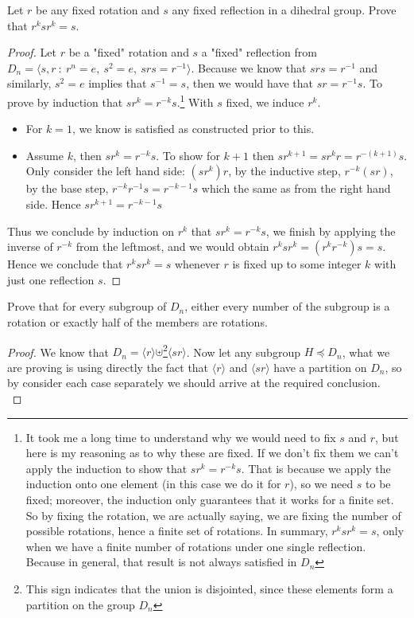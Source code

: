 \begin{assignment}[
  header=HeaderA,
  body=BodyA,
  title={Homework 2},
  duedate={17-February-2026},
  toc=false,
  toctitle={This appears on the Table of contents.},
  exlist=false
]
\begin{exer}[Problem 2.41]
Let $r$ be any fixed rotation and $s$ any fixed reflection in a dihedral group. Prove that $r^ksr^k = s$.
\begin{proof}
Let $r$ be a "fixed" rotation and $s$ a "fixed" reflection from $D_n = \langle s,r \ : \ r^n = e,\ s^2 = e,\ srs = r^{-1}\rangle$. Because we know that $srs = r^{-1}$ and similarly, $s^2 = e $ implies that $s^{-1} = s$, then we would have that $sr = r^{-1}s$. To prove by induction that $sr^k = r^{-k}s$.\footnote{It took me a long time to understand why we would need to fix $s$ and $r$, but here is my reasoning as to why these are fixed. If we don't fix them we can't apply the induction to show that $sr^{k} = r^{-k}s$. That is because we apply the induction onto one element (in this case we do it for $r$), so we need $s$ to be fixed; moreover, the induction only guarantees that it works for a finite set. So by fixing the rotation, we are actually saying, we are fixing the number of possible rotations, hence a finite set of rotations. In summary, $r^ksr^k = s$, only when we have a finite number of rotations under one single reflection. Because in general, that result is not always satisfied in $D_n$} With $s$ fixed, we induce $r^k$.

\begin{itemize}
    \item[Base case:] For $k = 1$, we know is satisfied as constructed prior to this. 
    \item[Induction:] Assume $k$, then $sr^k = r^{-k}s$. To show for $k+1$ then $sr^{k+1} = sr^kr = r^{-(k+1)}s$. Only consider the left hand side: $(sr^k)r$, by the inductive step, $r^{-k}(sr)$, by the base step, $r^{-k}r^{-1}s = r^{-k-1}s$ which the same as from the right hand side. Hence $sr^{k+1} = r^{-k-1}s$  
\end{itemize}

Thus we conclude by induction on $r^k$ that $sr^{k} = r^{-k}s$, we finish by applying the inverse of $r^{-k}$ from the leftmost, and we would obtain $r^{k}sr^{k} = (r^{k}r^{-k})s = s$. Hence we conclude that $r^ksr^k = s$ whenever $r$ is fixed up to some integer $k$ with just one reflection $s$.  
\end{proof}
\end{exer}

\begin{exer}[Problem 3.30]
Prove that for every subgroup of $D_n$, either every number of the subgroup is a rotation or exactly half of the members are rotations.    
\begin{proof}
We know that $D_n = \langle r\rangle $$\uplus$\footnote{This sign indicates that the union is disjointed, since these elements form a partition on the group $D_n$}$ \langle sr \rangle$. Now let any subgroup $H\preccurlyeq D_n$, what we are proving is using directly the fact that $\langle r \rangle$ and $\langle sr \rangle$ have a partition on $D_n$, so by consider each case separately we should arrive at the required conclusion.\\


\end{proof}
\end{exer}
\end{assignment}

